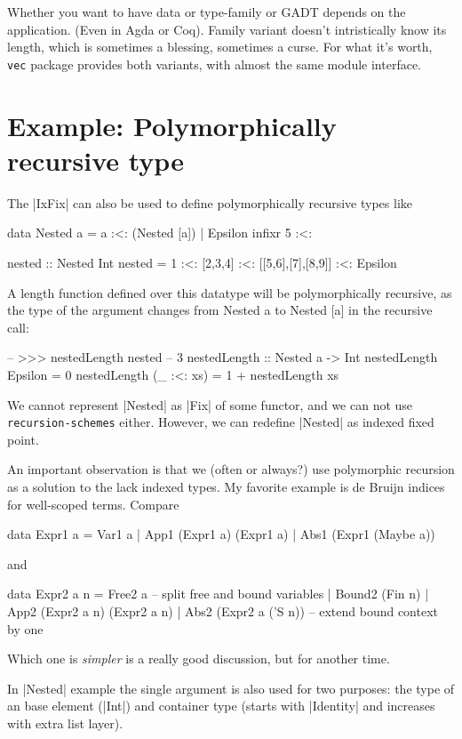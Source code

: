 Whether you want to have data or type-family or GADT depends on the application.
(Even in Agda or Coq). Family variant doesn't intristically know its length,
which is sometimes a blessing, sometimes a curse.
For what it's worth, \texttt{vec} package provides both variants,
with almost the same module interface.

\section{Example: Polymorphically recursive type}

The |IxFix| can also be used to define polymorphically recursive types like

\begin{code}
data Nested a = a :<: (Nested [a]) | Epsilon
infixr 5 :<:

nested :: Nested Int
nested = 1 :<: [2,3,4] :<: [[5,6],[7],[8,9]] :<: Epsilon
\end{code}

A length function defined over this datatype will be polymorphically recursive,
as the type of the argument changes from Nested a to Nested [a] in the recursive call:

\begin{code}
-- >>> nestedLength nested
-- 3
nestedLength :: Nested a -> Int
nestedLength Epsilon    = 0
nestedLength (_ :<: xs) = 1 + nestedLength xs
\end{code}

We cannot represent |Nested| as |Fix| of some functor,
and we can not use \texttt{recursion-schemes} either.
However, we can redefine |Nested| as indexed fixed point.

An important observation is that we (often or always?) use polymorphic recursion
as a solution to the lack indexed types.
My favorite example is de Bruijn indices for well-scoped terms.
Compare
\begin{code}
data Expr1 a
    = Var1 a
    | App1 (Expr1 a) (Expr1 a)
    | Abs1 (Expr1 (Maybe a))
\end{code}
and
\begin{code}
data Expr2 a n
    = Free2 a                -- split free and bound variables
    | Bound2 (Fin n)
    | App2 (Expr2 a n) (Expr2 a n)
    | Abs2 (Expr2 a ('S n))  -- extend bound context by one
\end{code}
Which one is \emph{simpler} is a really good discussion,
but for another time.

In |Nested| example the single argument is also used for two
purposes: the type of an base element (|Int|) and container type
(starts with |Identity| and increases with extra list layer).

